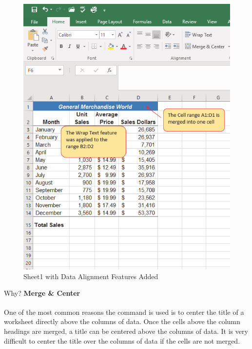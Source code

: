 \begin{figure}[H]
	\centering
	\includegraphics[width=\maxwidth{.95\linewidth}]{gfx/ch01_fig40}
	\caption{Sheet1 with Data Alignment Features Added}
	\label{01:fig40}
\end{figure}

\begin{center}
	\begin{infobox}{Why?}
		\textbf{Merge \& Center}
		\\
		\\
		One of the most common reasons the  command is used is to center the title of a worksheet directly above the columns of data. Once the cells above the column headings are merged, a title can be centered above the columns of data. It is very difficult to center the title over the columns of data if the cells are not merged.
	\end{infobox}
\end{center}

